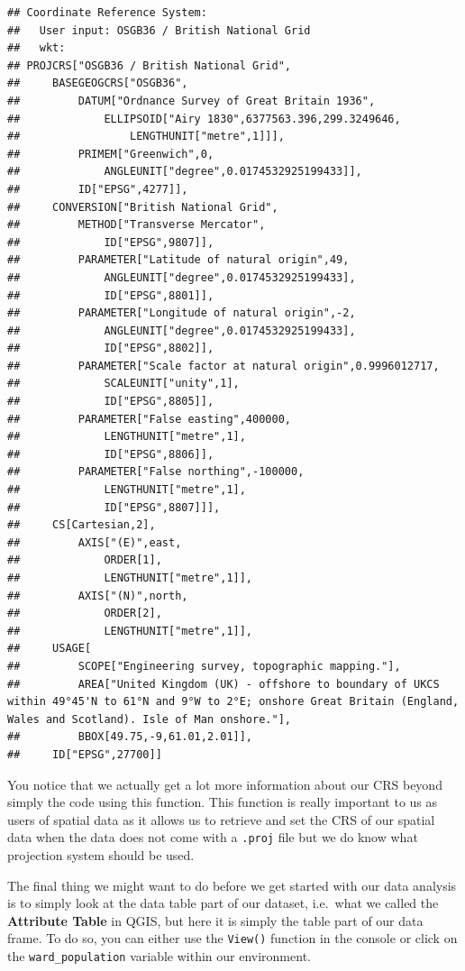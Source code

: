 \documentclass[
]{book}
\begin{document}
\begin{verbatim}
## Coordinate Reference System:
##   User input: OSGB36 / British National Grid 
##   wkt:
## PROJCRS["OSGB36 / British National Grid",
##     BASEGEOGCRS["OSGB36",
##         DATUM["Ordnance Survey of Great Britain 1936",
##             ELLIPSOID["Airy 1830",6377563.396,299.3249646,
##                 LENGTHUNIT["metre",1]]],
##         PRIMEM["Greenwich",0,
##             ANGLEUNIT["degree",0.0174532925199433]],
##         ID["EPSG",4277]],
##     CONVERSION["British National Grid",
##         METHOD["Transverse Mercator",
##             ID["EPSG",9807]],
##         PARAMETER["Latitude of natural origin",49,
##             ANGLEUNIT["degree",0.0174532925199433],
##             ID["EPSG",8801]],
##         PARAMETER["Longitude of natural origin",-2,
##             ANGLEUNIT["degree",0.0174532925199433],
##             ID["EPSG",8802]],
##         PARAMETER["Scale factor at natural origin",0.9996012717,
##             SCALEUNIT["unity",1],
##             ID["EPSG",8805]],
##         PARAMETER["False easting",400000,
##             LENGTHUNIT["metre",1],
##             ID["EPSG",8806]],
##         PARAMETER["False northing",-100000,
##             LENGTHUNIT["metre",1],
##             ID["EPSG",8807]]],
##     CS[Cartesian,2],
##         AXIS["(E)",east,
##             ORDER[1],
##             LENGTHUNIT["metre",1]],
##         AXIS["(N)",north,
##             ORDER[2],
##             LENGTHUNIT["metre",1]],
##     USAGE[
##         SCOPE["Engineering survey, topographic mapping."],
##         AREA["United Kingdom (UK) - offshore to boundary of UKCS within 49°45'N to 61°N and 9°W to 2°E; onshore Great Britain (England, Wales and Scotland). Isle of Man onshore."],
##         BBOX[49.75,-9,61.01,2.01]],
##     ID["EPSG",27700]]
\end{verbatim}

You notice that we actually get a lot more information about our CRS beyond simply the code using this function. This function is really important to us as users of spatial data as it allows us to retrieve and set the CRS of our spatial data when the data does not come with a \texttt{.proj} file but we do know what projection system should be used.

The final thing we might want to do before we get started with our data analysis is to simply look at the data table part of our dataset, i.e.~what we called the \textbf{Attribute Table} in QGIS, but here it is simply the table part of our data frame. To do so, you can either use the \texttt{View()} function in the console or click on the \texttt{ward\_population} variable within our environment.
\end{document}
